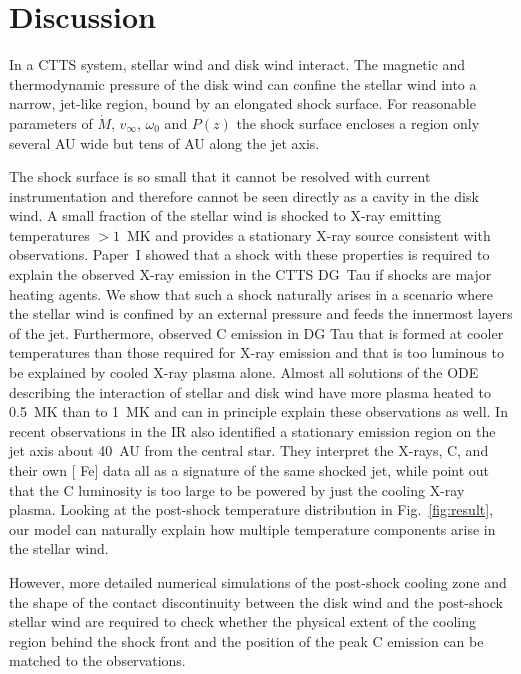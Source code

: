 \section{Discussion}
\label{sect:discussion}
In a CTTS system, stellar wind and disk wind interact. The magnetic and thermodynamic pressure of the disk wind can confine the stellar wind into a narrow, jet-like region, bound by an elongated shock surface. For reasonable parameters of $\dot M$, $v_\infty$, $\omega_0$ and $P(z)$ the shock surface encloses a region only several AU wide but tens of AU along the jet axis. 
 
The shock surface is so small that it cannot be resolved with current instrumentation and therefore cannot be seen directly as a cavity in the disk wind. A small fraction of the stellar wind is shocked to X-ray emitting temperatures $>1$~MK and provides a stationary X-ray source consistent with observations. 
Paper~I showed that a shock with these properties is required to explain the observed X-ray emission in the CTTS DG~Tau if shocks are major heating agents. We show that such a shock naturally arises in a scenario where the stellar wind is confined by an external pressure and feeds the innermost layers of the jet.
Furthermore, \citet{2013A&A...550L...1S} observed C emission in DG Tau that is formed at cooler temperatures than those required for X-ray emission and that is too luminous to be explained by cooled X-ray plasma alone. Almost all solutions of the ODE describing the interaction of stellar and disk wind have more plasma heated to 0.5~MK than to 1~MK and can in principle explain these observations as well. In recent observations in the IR \citet{2014arXiv1404.0728W} also identified a stationary emission region on the jet axis about 40~AU from the central star. They interpret the X-rays,  C, and their own [ Fe] data all as a signature of the same shocked jet, while \citet{2013A&A...550L...1S} point out that the C luminosity is too large to be powered by just the cooling X-ray plasma. Looking at the post-shock temperature distribution in Fig.~\ref{fig:result}, our model can naturally explain how multiple temperature components arise in the stellar wind.

However, more detailed numerical simulations of the post-shock cooling zone and the shape of the contact discontinuity between the disk wind and the post-shock stellar wind are required to check whether the physical extent of the cooling region behind the shock front and the position of the peak  C emission can be matched to the observations.

